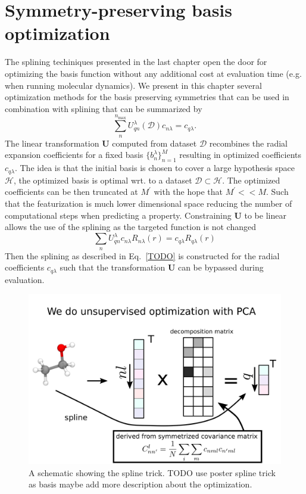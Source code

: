 \chapter{Symmetry-preserving basis optimization}
The splining techiniques presented in the last chapter open the door for optimizing the basis function without any additional cost at evaluation time (e.g. when running molecular dynamics).
We present in this chapter several optimization methods for the basis preserving symmetries that can be used in combination with splining that can be summarized by 
\begin{equation}
  \sum_{n}^{n_\textrm{max}}U_{qn}^{\lambda}(\mathcal{D}) c_{n\lambda} = c_{q\lambda}.
\end{equation}
The linear transformation $\mathbf{U}$ computed from dataset $\mathcal{D}$ recombines the radial expansion coefficients for a fixed basis $\{b_{n}^\lambda\}_{n=1}^M$ resulting in optimized coefficients $c_{q\lambda}$.
The idea is that the initial basis is chosen to cover a large hypothesis space $\mathcal{H}$, the optimized basis is optimal wrt. to a dataset $\mathcal{D}\subset\mathcal{H}$.
The optimized coefficients can be then truncated at $M^\prime$ with the hope that $M^\prime << M$.
Such that the featurization is much lower dimensional space reducing the number of computational steps when predicting a property.
Constraining $\mathbf{U}$ to be linear allows the use of the splining as the targeted function is not changed
\begin{equation}
  \sum_n U_{qn}^{\lambda} c_{n\lambda} R_{n\lambda}(r) = c_{q\lambda} R_{q\lambda}(r)
\end{equation}
Then the splining as described in Eq.~\ref{TODO} is constructed for the radial coefficients $c_{q\lambda}$ such that the transformation $\mathbf{U}$ can be bypassed during evaluation.
\begin{figure}
    \includegraphics[width=\textwidth]{fig/slide22_0.png}
    \caption{A schematic showing the spline trick. TODO use poster spline trick as basis maybe add more description about the optimization.}
    \label{fig:spline_trick}
\end{figure}

